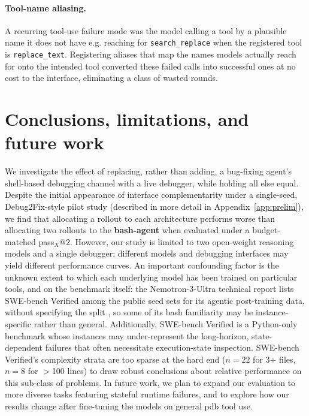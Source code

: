 \documentclass{article}
\begin{document}
\paragraph{Tool-name aliasing.} A recurring tool-use failure mode was the model calling a tool by a plausible name it does not have e.g. reaching for \texttt{search\_replace} when the registered tool is \texttt{replace\_text}. Registering aliases that map the names models actually reach for onto the intended tool converted these failed calls into successful ones at no cost to the interface, eliminating a class of wasted rounds. 

\section{Conclusions, limitations, and future work}
We investigate the effect of replacing, rather than adding, a bug-fixing agent's shell-based debugging channel with a live debugger, while holding all else equal. Despite the initial appearance of interface complementarity under a single-seed, Debug2Fix-style pilot study (described in more detail in Appendix~\ref{app:prelim}), we find that allocating a rollout to each architecture performs worse than allocating two rollouts to the \textbf{bash-agent} when evaluated under a budget-matched pass$_X$@$2$. However, our study is limited to two open-weight reasoning models and a single debugger; different models and debugging interfaces may yield different performance curves. An important confounding factor is the unknown extent to which each underlying model has been trained on particular tools, and on the benchmark itself: the Nemotron-3-Ultra technical report lists SWE-bench Verified among the public seed sets for its agentic post-training data, without specifying the split \cite{nvidia2026nemotron3ultra}, so some of its bash familiarity may be instance-specific rather than general. Additionally, SWE-bench Verified is a Python-only benchmark whose instances may under-represent the long-horizon, state-dependent failures that often necessitate execution-state inspection. SWE-bench Verified's complexity strata are too sparse at the hard end ($n{=}22$ for 3+ files, $n{=}8$ for $>$100 lines) to draw robust conclusions about relative performance on this sub-class of problems. In future work, we plan to expand our evaluation to more diverse tasks featuring stateful runtime failures, and to explore how our results change after fine-tuning the models on general pdb tool use.

\FloatBarrier




\newpage

\appendix
 
\end{document}
